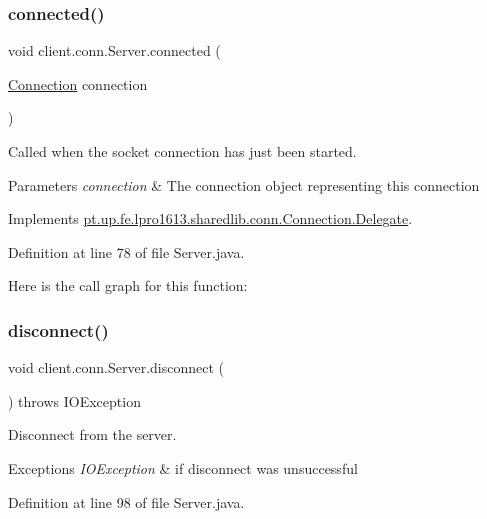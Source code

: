 \subsubsection{\texorpdfstring{connected()}{connected()}}
{\footnotesize\ttfamily void client.\+conn.\+Server.\+connected (\begin{DoxyParamCaption}\item[{\hyperlink{classpt_1_1up_1_1fe_1_1lpro1613_1_1sharedlib_1_1conn_1_1_connection}{Connection}}]{connection }\end{DoxyParamCaption})}

Called when the socket connection has just been started.


\begin{DoxyParams}{Parameters}
{\em connection} & The connection object representing this connection \\
\hline
\end{DoxyParams}


Implements \hyperlink{interfacept_1_1up_1_1fe_1_1lpro1613_1_1sharedlib_1_1conn_1_1_connection_1_1_delegate_afeb3c54ced46916733df2ba0b0e2d87e}{pt.\+up.\+fe.\+lpro1613.\+sharedlib.\+conn.\+Connection.\+Delegate}.



Definition at line 78 of file Server.\+java.

Here is the call graph for this function\+:
\hypertarget{classclient_1_1conn_1_1_server_ab69a81693f41986321e92120aa0918cb}{}\label{classclient_1_1conn_1_1_server_ab69a81693f41986321e92120aa0918cb} 
\subsubsection{\texorpdfstring{disconnect()}{disconnect()}}
{\footnotesize\ttfamily void client.\+conn.\+Server.\+disconnect (\begin{DoxyParamCaption}{ }\end{DoxyParamCaption}) throws I\+O\+Exception}

Disconnect from the server. 
\begin{DoxyExceptions}{Exceptions}
{\em I\+O\+Exception} & if disconnect was unsuccessful \\
\hline
\end{DoxyExceptions}


Definition at line 98 of file Server.\+java.

